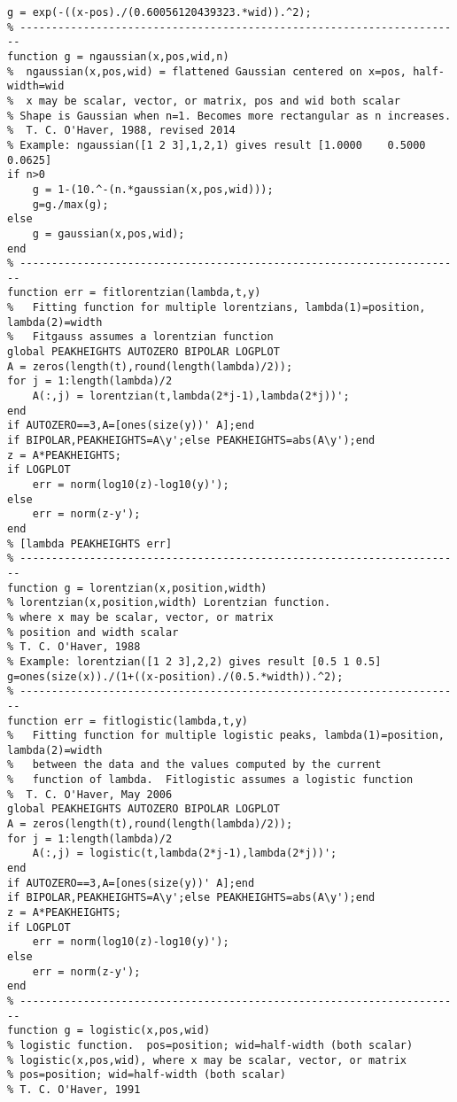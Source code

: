 \begin{lstlisting}
g = exp(-((x-pos)./(0.60056120439323.*wid)).^2);
% ----------------------------------------------------------------------
function g = ngaussian(x,pos,wid,n)
%  ngaussian(x,pos,wid) = flattened Gaussian centered on x=pos, half-width=wid
%  x may be scalar, vector, or matrix, pos and wid both scalar
% Shape is Gaussian when n=1. Becomes more rectangular as n increases.
%  T. C. O'Haver, 1988, revised 2014
% Example: ngaussian([1 2 3],1,2,1) gives result [1.0000    0.5000    0.0625]
if n>0
    g = 1-(10.^-(n.*gaussian(x,pos,wid)));
    g=g./max(g);
else
    g = gaussian(x,pos,wid);
end
% ----------------------------------------------------------------------
function err = fitlorentzian(lambda,t,y)
%	Fitting function for multiple lorentzians, lambda(1)=position, lambda(2)=width
%	Fitgauss assumes a lorentzian function 
global PEAKHEIGHTS AUTOZERO BIPOLAR LOGPLOT
A = zeros(length(t),round(length(lambda)/2));
for j = 1:length(lambda)/2
    A(:,j) = lorentzian(t,lambda(2*j-1),lambda(2*j))';
end
if AUTOZERO==3,A=[ones(size(y))' A];end
if BIPOLAR,PEAKHEIGHTS=A\y';else PEAKHEIGHTS=abs(A\y');end
z = A*PEAKHEIGHTS;
if LOGPLOT
    err = norm(log10(z)-log10(y)');
else
    err = norm(z-y');
end
% [lambda PEAKHEIGHTS err]
% ----------------------------------------------------------------------
function g = lorentzian(x,position,width)
% lorentzian(x,position,width) Lorentzian function.
% where x may be scalar, vector, or matrix
% position and width scalar
% T. C. O'Haver, 1988
% Example: lorentzian([1 2 3],2,2) gives result [0.5 1 0.5]
g=ones(size(x))./(1+((x-position)./(0.5.*width)).^2);
% ----------------------------------------------------------------------
function err = fitlogistic(lambda,t,y)
%	Fitting function for multiple logistic peaks, lambda(1)=position, lambda(2)=width
%	between the data and the values computed by the current
%	function of lambda.  Fitlogistic assumes a logistic function 
%  T. C. O'Haver, May 2006
global PEAKHEIGHTS AUTOZERO BIPOLAR LOGPLOT
A = zeros(length(t),round(length(lambda)/2));
for j = 1:length(lambda)/2
    A(:,j) = logistic(t,lambda(2*j-1),lambda(2*j))';
end
if AUTOZERO==3,A=[ones(size(y))' A];end
if BIPOLAR,PEAKHEIGHTS=A\y';else PEAKHEIGHTS=abs(A\y');end
z = A*PEAKHEIGHTS;
if LOGPLOT
    err = norm(log10(z)-log10(y)');
else
    err = norm(z-y');
end
% ----------------------------------------------------------------------
function g = logistic(x,pos,wid)
% logistic function.  pos=position; wid=half-width (both scalar)
% logistic(x,pos,wid), where x may be scalar, vector, or matrix
% pos=position; wid=half-width (both scalar)
% T. C. O'Haver, 1991 

\end{lstlisting}
